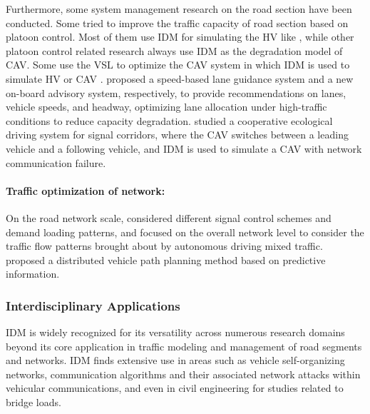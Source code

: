 \documentclass[a4paper,fleqn]{cas-sc}
\begin{document}
Furthermore, some system management research on the road section have been conducted. Some tried to improve the traffic capacity of road section based on platoon control.  Most of them use IDM for simulating the HV like \cite{ferreira_impact_2012,ge_optimal_2017,heEcoDrivingAdvisoryStrategiesPlatoon2018a,liu_joint_2022,montaninoTrajectoryDataReconstructionSimulationBased2015b,wangRollingHorizonControlFramework2014b,wang_optimal_2022,wang_trajectory_2022}, while other platoon control related research always use IDM as the degradation model of CAV. Some use the VSL to optimize the CAV system in which IDM is used to simulate HV or CAV \citep{khondakerVariableSpeedLimitMicroscopic2015a,li_developing_2022,li_integrated_2017,luTD3LVSLLaneLevelVariableSpeed2023a,othman_analysis_2022}. \cite{mahajan_improving_2024,schakel_improving_2014} proposed a speed-based lane guidance system and a new on-board advisory system, respectively, to provide recommendations on lanes, vehicle speeds, and headway, optimizing lane allocation under high-traffic conditions to reduce capacity degradation. \cite{wang_cooperative_2020} studied a cooperative ecological driving system for signal corridors, where the CAV switches between a leading vehicle and a following vehicle, and IDM is used to simulate a CAV with network communication failure.

\paragraph{\textbf{Traffic optimization of network:}}
On the road network scale, \cite{huang_characterizing_2023} considered different signal control schemes and demand loading patterns, and focused on the overall network level to consider the traffic flow patterns brought about by autonomous driving mixed traffic. \cite{claes_decentralized_2011} proposed a distributed vehicle path planning method based on predictive information.

\subsubsection{Interdisciplinary Applications}

 IDM is widely recognized for its versatility across numerous research domains beyond its core application in traffic modeling and management of road segments and networks. IDM finds extensive use in areas such as vehicle self-organizing networks, communication algorithms and their associated network attacks within vehicular communications, and even in civil engineering for studies related to bridge loads.
\end{document}
